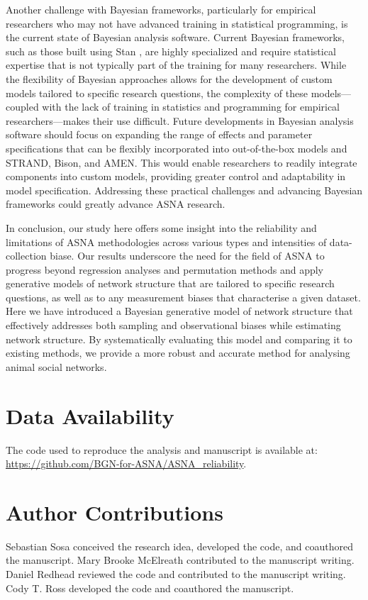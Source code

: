 \documentclass[Afour,sageh,times]{sagej}
\begin{document}
Another challenge with Bayesian frameworks, particularly for empirical researchers who may not have advanced training in statistical programming, is the current state of Bayesian analysis software. Current Bayesian frameworks, such as those built using Stan \citep{stan2021}, are highly specialized and require statistical expertise that is not typically part of the training for many researchers. While the flexibility of Bayesian approaches allows for the development of custom models  tailored to specific research questions, the complexity of these models---coupled with the lack of training in statistics and programming for empirical researchers---makes their use difficult. Future developments in Bayesian analysis software should focus on expanding the range of effects and parameter specifications that can be flexibly incorporated into out-of-the-box models \citep[e.g., in a similar vein to the RSiena software:][]{ripley2011manual} and STRAND, Bison, and AMEN. This would enable researchers to readily integrate components into custom models, providing greater control and adaptability in model specification. %
Addressing these practical challenges and advancing Bayesian frameworks could greatly advance ASNA research. 

In conclusion, our study here offers some insight into the reliability and limitations of ASNA methodologies across various types and intensities of data-collection biase. Our results underscore the need for the field of ASNA to progress beyond regression analyses and permutation methods and apply generative models of network structure that are tailored to specific research questions, as well as to any measurement biases that characterise a given dataset. Here we have introduced a Bayesian generative model of network structure that effectively addresses both sampling and observational biases while estimating network structure. By systematically evaluating this model and comparing it to existing methods, we provide a more robust and accurate method for analysing animal social networks. %

\section{Data Availability}
The code used to reproduce the analysis and manuscript is available at: \url{https://github.com/BGN-for-ASNA/ASNA_reliability}.

\section{Author Contributions}
Sebastian Sosa conceived the research idea, developed the code, and coauthored the manuscript.
Mary Brooke McElreath contributed to the manuscript writing.
Daniel Redhead reviewed the code and contributed to the manuscript writing.
Cody T. Ross developed the code and coauthored the manuscript.


\end{document}
